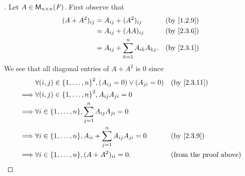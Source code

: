\begin{proof}[]
  Let \(A \in \mathsf{M}_{{n} \times n}({\mathit{F}})\).
  First observe that
  \begin{align*}
    (A + A^2)_{i j} & = A_{i j} + (A^2)_{i j}                     &  & \text{(by \cref{1.2.9})} \\
                    & = A_{i j} + (AA)_{i j}                      &  & \text{(by \cref{2.3.6})} \\
                    & = A_{i j} + \sum_{k = 1}^n A_{i k} A_{k j}. &  & \text{(by \cref{2.3.1})}
  \end{align*}
  We see that all diagonal entries of \(A + A^2\) is \(0\) since
  \begin{align*}
             & \forall (i, j) \in \set{1, \dots, n}^2, (A_{i j} = 0) \lor (A_{j i} = 0)      &  & \text{(by \cref{2.3.11})}     \\
    \implies & \forall (i, j) \in \set{1, \dots, n}^2, A_{i j} A_{j i} = 0                                                      \\
    \implies & \forall i \in \set{1, \dots, n}, \sum_{j = 1}^n A_{i j} A_{j i} = 0                                              \\
    \implies & \forall i \in \set{1, \dots, n}, A_{i i} + \sum_{j = 1}^n A_{i j} A_{j i} = 0 &  & \text{(by \cref{2.3.9})}      \\
    \implies & \forall i \in \set{1, \dots, n}, (A + A^2)_{i i} = 0.                         &  & \text{(from the proof above)}
  \end{align*}


\end{proof}
